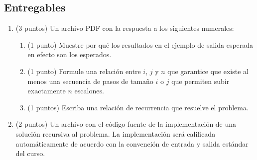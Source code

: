 \subsection{Entregables}

\begin{enumerate}
  \item (3 puntos) Un archivo PDF con la respuesta a los siguientes numerales:
  \begin{enumerate}
      \item (1 punto) Muestre por qué los resultados en el ejemplo de salida esperada en efecto son los esperados.
      \item (1 punto) Formule una relación entre $i$, $j$ y $n$ que garantice que existe al menos una secuencia de pasos de tamaño $i$ o $j$ que permiten subir exactamente $n$ escalones.
      \item (1 puntos) Escriba una relación de recurrencia que resuelve el problema.
  \end{enumerate}
  \item (2 puntos) Un archivo con el código fuente de la implementación de una solución recursiva al problema. La implementación será calificada automáticamente de acuerdo con la convención de entrada y salida estándar del curso.
\end{enumerate}